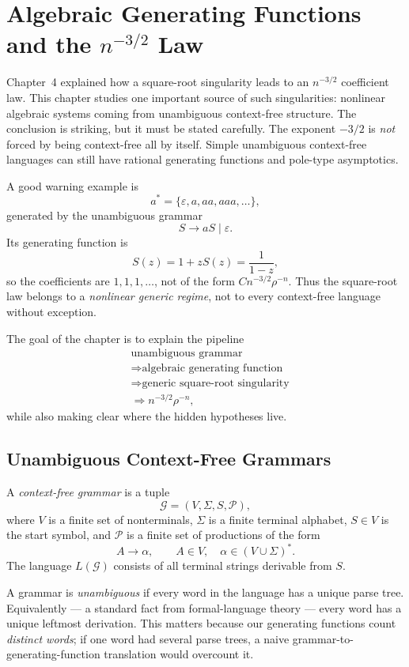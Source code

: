 \chapter{Algebraic Generating Functions and the $n^{-3/2}$ Law}

Chapter~4 explained how a square-root singularity leads to an $n^{-3/2}$ coefficient law. This chapter studies one important source of such singularities: nonlinear algebraic systems coming from unambiguous context-free structure. The conclusion is striking, but it must be stated carefully. The exponent $-3/2$ is \emph{not} forced by being context-free all by itself. Simple unambiguous context-free languages can still have rational generating functions and pole-type asymptotics.

A good warning example is
\[
  a^* = \{\varepsilon, a, aa, aaa, \dots\},
\]
generated by the unambiguous grammar
\[
  S \to aS \mid \varepsilon.
\]
Its generating function is
\[
  S(z) = 1 + zS(z) = \frac{1}{1-z},
\]
so the coefficients are $1,1,1,\dots$, not of the form $Cn^{-3/2}\rho^{-n}$. Thus the square-root law belongs to a \emph{nonlinear generic regime}, not to every context-free language without exception.

The goal of the chapter is to explain the pipeline
\begin{align*}
  &\text{unambiguous grammar} \\
  &\Longrightarrow \text{algebraic generating function} \\
  &\Longrightarrow \text{generic square-root singularity} \\
  &\Longrightarrow n^{-3/2}\rho^{-n},
\end{align*}
while also making clear where the hidden hypotheses live.

\section{Unambiguous Context-Free Grammars}

A \emph{context-free grammar} is a tuple
\[
  \mathcal{G} = (V,\Sigma,S,\mathcal{P}),
\]
where $V$ is a finite set of nonterminals, $\Sigma$ is a finite terminal alphabet, $S \in V$ is the start symbol, and $\mathcal{P}$ is a finite set of productions of the form
\[
  A \to \alpha, \qquad A \in V, \quad \alpha \in (V \cup \Sigma)^*.
\]
The language $L(\mathcal{G})$ consists of all terminal strings derivable from $S$.

A grammar is \emph{unambiguous} if every word in the language has a unique parse tree. Equivalently --- a standard fact from formal-language theory --- every word has a unique leftmost derivation. This matters because our generating functions count \emph{distinct words}; if one word had several parse trees, a naive grammar-to-generating-function translation would overcount it.

